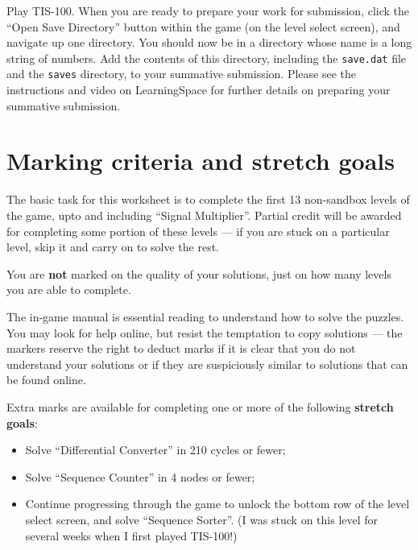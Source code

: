 \documentclass{../../../fal_assignment}
\begin{document}
Play TIS-100.
When you are ready to prepare your work for submission, click the ``Open Save Directory'' button within the game (on the level select screen),
and navigate up one directory.
You should now be in a directory whose name is a long string of numbers.
Add the contents of this directory, including the \texttt{save.dat} file and the \texttt{saves} directory, to your summative submission.
Please see the instructions and video on LearningSpace for further details on preparing your summative submission.

\section*{Marking criteria and stretch goals}

The basic task for this worksheet is to complete the first 13 non-sandbox levels of the game, upto and including ``Signal Multiplier''.
Partial credit will be awarded for completing some portion of these levels --- if you are stuck on a particular level, skip it and carry on to solve the rest.

You are \textbf{not} marked on the quality of your solutions, just on how many levels you are able to complete.

The in-game manual is essential reading to understand how to solve the puzzles.
You may look for help online, but resist the temptation to copy solutions ---
the markers reserve the right to deduct marks if it is clear that you do not understand your solutions
or if they are suspiciously similar to solutions that can be found online.

Extra marks are available for completing one or more of the following \textbf{stretch goals}:

	\begin{itemize}
		\item Solve ``Differential Converter'' in 210 cycles or fewer;
		\item Solve ``Sequence Counter'' in 4 nodes or fewer;
		\item Continue progressing through the game to unlock the bottom row of the level select screen, and solve ``Sequence Sorter''. (I was stuck on this level for several weeks when I first played TIS-100!)
	\end{itemize}
\end{document}
